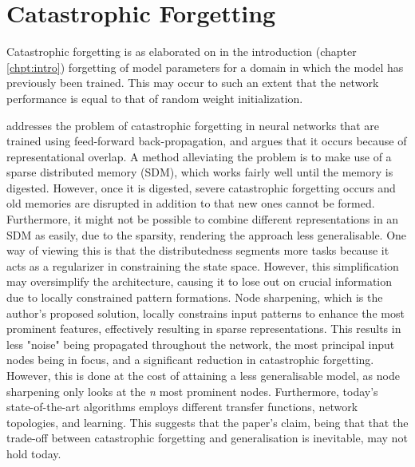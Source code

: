 \section{Catastrophic Forgetting}

Catastrophic forgetting \citep{McCloskey1989, Ratcliff1990} is as elaborated on in the introduction (chapter \ref{chpt:intro}) forgetting of model parameters for a domain in which the model has previously been trained. This may occur to such an extent that the network performance is equal to that of random weight initialization.

\cite{French1992} addresses the problem of catastrophic forgetting in neural networks that are trained using feed-forward back-propagation, and argues that it occurs because of representational overlap. A method alleviating the problem is to make use of a sparse distributed memory (SDM), which works fairly well until the memory is digested. However, once it is digested, severe catastrophic forgetting occurs and old memories are disrupted in addition to that new ones cannot be formed. Furthermore, it might not be possible to combine different representations in an SDM as easily, due to the sparsity, rendering the approach less generalisable. One way of viewing this is that the distributedness segments more tasks because it acts as a regularizer in constraining the state space. However, this simplification may oversimplify the architecture, causing it to lose out on crucial information due to locally constrained pattern formations. Node sharpening, which is the author's proposed solution, locally constrains input patterns to enhance the most prominent features, effectively resulting in sparse representations. This results in less "noise" being propagated throughout the network, the most principal input nodes being in focus, and a significant reduction in catastrophic forgetting. However, this is done at the cost of attaining a less generalisable model, as node sharpening only looks at the \textit{n} most prominent nodes. Furthermore, today's state-of-the-art algorithms employs different transfer functions, network topologies, and learning. This suggests that the paper's claim, being that that the trade-off between catastrophic forgetting and generalisation is inevitable, may not hold today.

